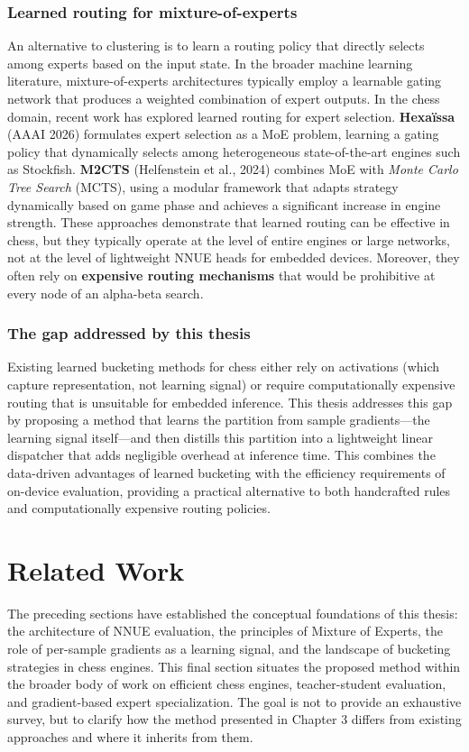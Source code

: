 \subsubsection{Learned routing for mixture-of-experts}
An alternative to clustering is to learn a routing policy that directly selects among experts based on the input state. In the broader machine learning literature, mixture-of-experts architectures typically employ a learnable gating network that produces a weighted combination of expert outputs. In the chess domain, recent work has explored learned routing for expert selection. \textbf{Hexaïssa} (AAAI 2026) formulates expert selection as a MoE problem, learning a gating policy that dynamically selects among heterogeneous state-of-the-art engines such as Stockfish. \textbf{M2CTS} (Helfenstein et al., 2024) combines MoE with \emph{Monte Carlo Tree Search} (MCTS), using a modular framework that adapts strategy dynamically based on game phase and achieves a significant increase in engine strength. These approaches demonstrate that learned routing can be effective in chess, but they typically operate at the level of entire engines or large networks, not at the level of lightweight NNUE heads for embedded devices. Moreover, they often rely on \textbf{expensive routing mechanisms} that would be prohibitive at every node of an alpha-beta search.

\subsubsection{The gap addressed by this thesis}
Existing learned bucketing methods for chess either rely on activations (which capture representation, not learning signal) or require computationally expensive routing that is unsuitable for embedded inference. This thesis addresses this gap by proposing a method that learns the partition from sample gradients---the learning signal itself---and then distills this partition into a lightweight linear dispatcher that adds negligible overhead at inference time. This combines the data-driven advantages of learned bucketing with the efficiency requirements of on-device evaluation, providing a practical alternative to both handcrafted rules and computationally expensive routing policies.


\section{Related Work}

The preceding sections have established the conceptual foundations of this thesis: the architecture of NNUE evaluation, the principles of Mixture of Experts, the role of per-sample gradients as a learning signal, and the landscape of bucketing strategies in chess engines. This final section situates the proposed method within the broader body of work on efficient chess engines, teacher-student evaluation, and gradient-based expert specialization. The goal is not to provide an exhaustive survey, but to clarify how the method presented in Chapter 3 differs from existing approaches and where it inherits from them.


